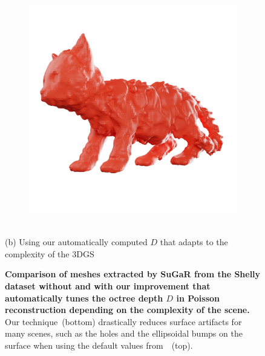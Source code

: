 \begin{figure}[tb]
\begin{subfigure}{0.19\linewidth}
  \end{subfigure}
  \hfill
  \begin{subfigure}{0.19\linewidth}
  \includegraphics[width=\linewidth]{images/meshes/kitten_frosting.png}
  \end{subfigure}
  \\
  {\small (b) Using our automatically computed $D$ that adapts to the complexity of the 3DGS}
  \caption{
  \textbf{Comparison of meshes extracted by SuGaR from the Shelly dataset without and with our improvement that automatically tunes the octree depth $D$ in Poisson reconstruction depending on the complexity of the scene.}
  Our technique~(bottom) drastically reduces surface artifacts for many scenes, such as the holes and the ellipsoidal bumps on the surface when using the default values from~\cite{guedon2023sugar}~(top).
}
  

\end{figure}
